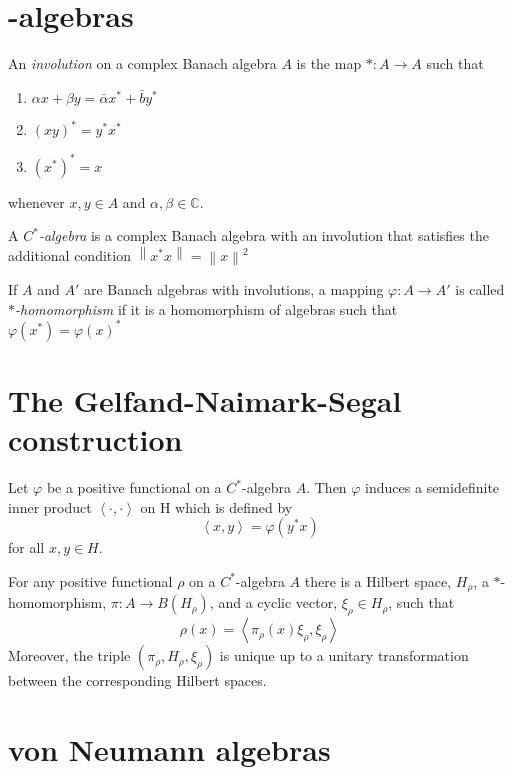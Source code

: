 \section{\Require-algebras}

An \emph{involution} on a complex Banach algebra \(A\) is the map \(\ast: A \to A\) such that
    \begin{enumerate}
        \item \(\alpha x + \beta y = \bar{\alpha}x^\ast + \bar{b}y^\ast\)
        \item \((xy)^\ast = y^\ast x^\ast \)
        \item \((x^\ast)^\ast = x\)
    \end{enumerate}
whenever \(x,y \in A\) and \(\alpha, \beta \in \mathbb{C}\).

A \emph{\(C^\ast\)-algebra} is a complex Banach algebra with an involution that satisfies the additional condition \(\left \lVert x^\ast x \right \rVert = \left \lVert x \right \rVert^2\)

If \(A\) and \(A'\) are Banach algebras with involutions, a mapping \(\varphi: A \to A'\) is called \emph{\(\ast\)-homomorphism} if it is a homomorphism of algebras such that \(\varphi(x^\ast) = \varphi(x)^\ast\)

\section{The Gelfand-Naimark-Segal construction}

Let \(\varphi\) be a positive functional on a \(C^\ast\)-algebra \(A\). Then \(\varphi\) induces a semidefinite inner product \(\left \langle \cdot , \cdot \right \rangle\) on H which is defined by \[\left \langle x,y \right \rangle = \varphi(y^\ast x) \]
for all \(x,y \in H\).

\begin{theorem}
    For any positive functional \(\rho\) on a \(C^\ast\)-algebra \(A\) there is a Hilbert space, \(H_\rho\), a \(\ast\)-homomorphism, \(\pi:A \to B(H_\rho)\), and a cyclic vector, \(\xi_\rho \in H_\rho\), such that
    \[\rho(x) = \left \langle \pi_\rho(x) \xi_\rho,\xi_\rho \right \rangle\]
    Moreover, the triple \((\pi_\rho,H_\rho,\xi_\rho)\) is unique up to a unitary transformation between the corresponding Hilbert spaces.
\end{theorem}

\section{von Neumann algebras}